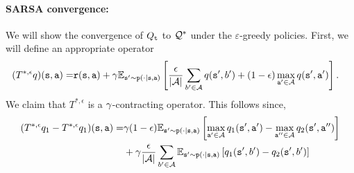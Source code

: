 \begin{advanced}
\paragraph{SARSA convergence:}

We will show the convergence of $Q_{\tt t}$ to $\mathcal{Q}^*$ under the $\varepsilon$-greedy policies. First, we will define an appropriate operator
\begin{align*}
  (T^{*,\epsilon}q)({\tt s},{\tt a}) =& {\tt r}({\tt s},{\tt a})+\gamma \mathbb{E}_{{\tt s}'\sim{\tt p}(\cdot|{\tt s},{\tt a})}\left[ \frac{\epsilon}{|\mathcal{A}|}\sum_{b'\in\mathcal{A}} q({\tt s}',b')+ (1-\epsilon)\max_{{\tt a}'\in\mathcal{A}}q({\tt s}',{\tt a}')\right] .
\end{align*}
We claim that $T^{*,\epsilon}$ is a $\gamma$-contracting operator. This follows since,
\begin{align*}
    (T^{*,\epsilon}q_1 -  T^{*,\epsilon}q_1)(\state,\action) =& 
    \discount(1-\epsilon) \E_{\state'\sim\transitionprob(\cdot|\state,\action)}\left[\max_{\action'\in\Actions}q_1(\state',\action')-\max_{\action''\in\Actions}q_2(\state',\action'')\right] \\
    &+\discount\frac{\epsilon}{|\Actions|}\sum_{b'\in\Actions} \E_{\state'\sim\transitionprob(\cdot|\state,\action)}\left[q_1(\state',b')-q_2(\state',b')\right]\\ 

\end{align*}
\end{advanced}

